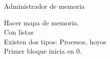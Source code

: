 \documentclass[11pt,letterpaper]{article}
\begin{document}
\begin{large}
\noindent Administrador de memoria
\end{large}



\noindent Hacer mapa de memoria.\\
Con listas\\
Existen dos tipos: Procesos, hoyos\\
Primer bloque inicia en 0. \\\medskip
\end{document}

